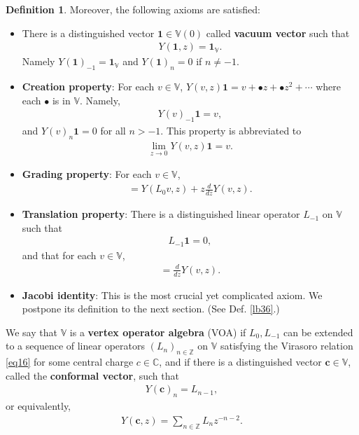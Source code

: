 \documentclass[11pt,b5paper,notitlepage]{article}
\theoremstyle{definition}
\newtheorem{df}{Definition}[section]
\theoremstyle{plain}
\newcommand{\id}{\mathbf{1}}
\newcommand{\blt}{\bullet}
\newcommand{\Vbb}{\mathbb V}
\newcommand{\Cbb}{\mathbb C}
\newcommand{\Zbb}{\mathbb Z}
\newcommand{\cbf}{\mathbf c}
\numberwithin{equation}{section}
\begin{document}
\begin{df}
Moreover, the following axioms are satisfied:
\begin{itemize}
\item There is a distinguished vector $\id\in\Vbb(0)$ called \textbf{vacuum vector} such that
\begin{align*}
	Y(\id,z)=\id_\Vbb.
\end{align*}
Namely $Y(\id)_{-1}=\id_\Vbb$ and $Y(\id)_n=0$ if $n\neq -1$.
\item \textbf{Creation property}: For each $v\in\Vbb$, $Y(v,z)\id=v+\blt z+\blt z^2+\cdots$ where each $\blt$ is in $\Vbb$. Namely,
\begin{align}
Y(v)_{-1}\id =v,	
\end{align}
and $Y(v)_{n}\id=0$ for all $n>-1$. This property is abbreviated to
\begin{align*}
\lim_{z\rightarrow0}Y(v,z)\id=v.	
\end{align*}
\item \textbf{Grading property}: For each $v\in\Vbb$,
\begin{align}
[L_0,Y(v,z)]=Y(L_0v,z)+z\frac d{dz}Y(v,z).	\label{eq19}
\end{align}
\item \textbf{Translation property}: There is a distinguished linear operator $L_{-1}$ on $\Vbb$  such that 
\begin{align}
L_{-1}\id=0,	
\end{align}
and that for each $v\in\Vbb$,
\begin{align}
[L_{-1},Y(v,z)]=\frac d{dz}Y(v,z).
\end{align}
\item \textbf{Jacobi identity}: This is the most crucial yet complicated axiom. We postpone its definition to the next section. (See Def. \ref{lb36}.)
\end{itemize}

We say that $\Vbb$ is a \textbf{vertex operator algebra} (VOA) if $L_0,L_{-1}$ can be extended to a sequence of linear operators $(L_n)_{n\in\Zbb}$ on $\Vbb$ satisfying the Virasoro relation \eqref{eq16} for some central charge $c\in\Cbb$, and if there is a distinguished vector $\cbf\in\Vbb$, called the \textbf{conformal vector}, such that
\begin{align}
Y(\cbf)_n=L_{n-1},\label{eq22}
\end{align}
or equivalently,
\begin{align}
Y(\cbf,z)=\sum_{n\in\Zbb} L_nz^{-n-2}.	
\end{align}
\hfill\qedsymbol
\end{df}
\end{document}
